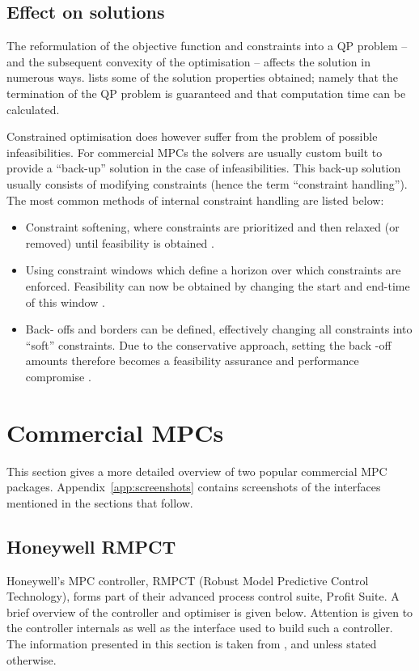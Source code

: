\subsection{Effect on solutions}\label{sec:coneffsol}
The reformulation of the objective function and constraints into a QP problem -- and the subsequent convexity of the optimisation -- affects the solution in numerous ways.
\citet[83]{maciejowskimpc} lists some of the solution properties obtained; namely that the termination of the QP problem is guaranteed and that computation time can be calculated.

Constrained optimisation does however suffer from the problem of possible infeasibilities. 
For commercial MPCs the solvers are usually custom built to provide a ``back-up'' solution in the case of infeasibilities.
This back-up solution usually consists of modifying constraints (hence the term ``constraint handling'').
The most common methods of internal constraint handling are listed below:
\begin{itemize}
\item Constraint softening, where constraints are prioritized and then relaxed (or removed) until feasibility is obtained \citep[160]{rossiter}.
\item Using constraint windows which define a horizon over which constraints are enforced.
Feasibility can now be obtained by changing the start and end-time of this window \citep[281-282]{maciejowskimpc}.
\item Back- offs and borders can be defined, effectively changing all constraints into ``soft'' constraints.
Due to the conservative approach, setting the back -off amounts therefore becomes a feasibility assurance and performance compromise .
\end{itemize}


\section{Commercial MPCs}\label{sec:commercialmpc}
This section gives a more detailed overview of two popular commercial MPC packages.
Appendix~\ref{app:screenshots} contains screenshots of the interfaces mentioned in the sections that follow.

\subsection{Honeywell RMPCT}
Honeywell's MPC controller, RMPCT (Robust Model Predictive Control Technology), forms part of their advanced process control suite, Profit Suite.
A brief overview of the controller and optimiser is given below. 
Attention is given to the controller internals as well as the interface used to build such a controller.
The information presented in this section is taken from \citet{honeywell1}, \citet{honeywell2} and \citet{honeywell3} unless stated otherwise.

